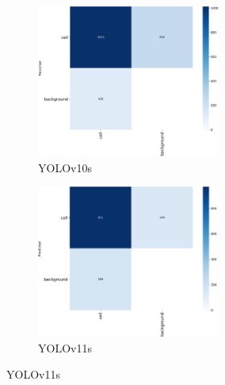 \documentclass[12pt,a4paper,onecolumn,oneside]{report}
\begin{document}
\begin{figure}[H]
  \vspace{0.1cm}
  \begin{subfigure}[b]{0.45\textwidth}
    \centering
    \includegraphics[height=5cm]{figuras/resultados experimentacion/yolov10s/test3/confusion_matrix.png}
    \vspace{-0.3cm}
    \caption{\footnotesize YOLOv10s}
    \label{fig:confusion_yolov10s_test3}
  \end{subfigure}
  \hfill
  \begin{subfigure}[b]{0.45\textwidth}
    \centering
    \includegraphics[height=5cm]{figuras/resultados experimentacion/yolov11s/test3/confusion_matrix.png}
    \vspace{-0.3cm}
    \caption{\footnotesize YOLOv11s}
    \label{fig:confusion_yolov11s_test3}
  \end{subfigure}
  

\end{figure}
\end{document}
